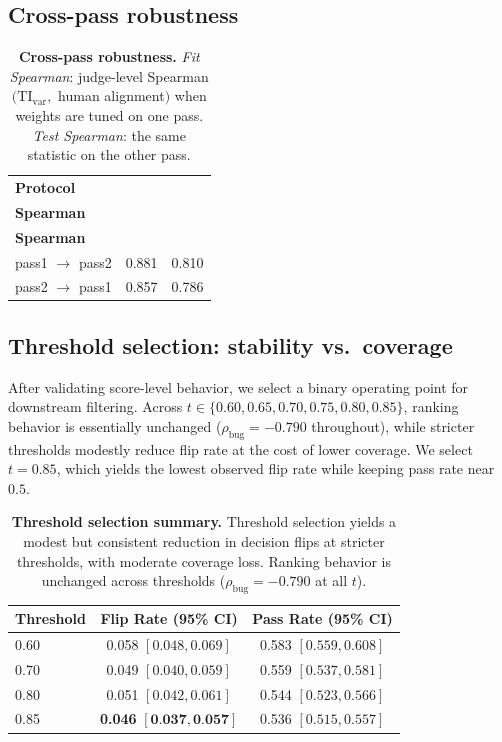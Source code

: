 \documentclass{article}
\begin{document}
\subsection{Cross-pass robustness}
\begin{table}[t]
  \centering
  \small
  \begin{tabular}{lcc}
    \toprule
    \textbf{Protocol}           & \makecell{\textbf{Fit}         \\ \textbf{Spearman}}  & \makecell{\textbf{Test} \\ \textbf{Spearman}} \\
    \midrule
    pass1 \(\rightarrow\) pass2 & 0.881                  & 0.810 \\
    pass2 \(\rightarrow\) pass1 & 0.857                  & 0.786 \\
    \bottomrule
  \end{tabular}
  \caption{\textbf{Cross-pass robustness.}
  \emph{Fit Spearman}: judge-level Spearman\((\mathrm{TI}_{\mathrm{var}},\) human alignment\()\) when weights are tuned on one pass.
  \emph{Test Spearman}: the same statistic on the other pass.}
  \label{tab:cross_pass_generalization}
\end{table}

\subsection{Threshold selection: stability vs.\ coverage}
After validating score-level behavior, we select a binary operating point for downstream filtering. Across \(t\in\{0.60,0.65,0.70,0.75,0.80,0.85\}\), ranking behavior is essentially unchanged (\(\rho_{\text{bug}}=-0.790\) throughout), while stricter thresholds modestly reduce flip rate at the cost of lower coverage. We select \(t=0.85\), which yields the lowest observed flip rate while keeping pass rate near \(0.5\).

\begin{table}[t]
  \centering
  \small
  \begin{tabular}{lcc}
    \toprule
    \textbf{Threshold} & \textbf{Flip Rate (95\% CI)}                        & \textbf{Pass Rate (95\% CI)} \\
    \midrule
    0.60               & 0.058 \([0.048, 0.069]\)                            & 0.583 \([0.559, 0.608]\)     \\
    0.70               & 0.049 \([0.040, 0.059]\)                            & 0.559 \([0.537, 0.581]\)     \\
    0.80               & 0.051 \([0.042, 0.061]\)                            & 0.544 \([0.523, 0.566]\)     \\
    0.85               & \textbf{0.046} \([\textbf{0.037}, \textbf{0.057}]\) & 0.536 \([0.515, 0.557]\)     \\
    \bottomrule
  \end{tabular}
  \caption{\textbf{Threshold selection summary.}
    Threshold selection yields a modest but consistent reduction in decision flips at stricter thresholds, with moderate coverage loss.
    Ranking behavior is unchanged across thresholds (\(\rho_{\text{bug}}=-0.790\) at all \(t\)).}
  \label{tab:exp13_threshold_sweep}
\end{table}
\end{document}
